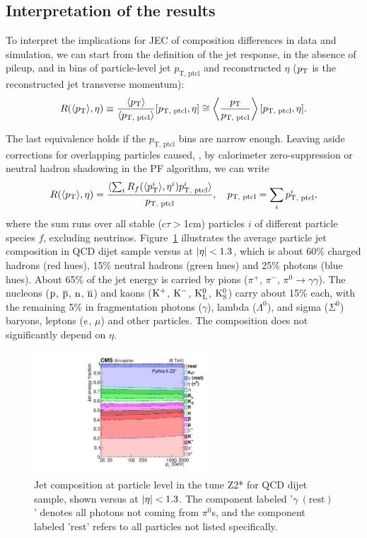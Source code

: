\documentclass[11pt,twoside,a4paper,cmspaper,final,collab]{cms-tdr}
\begin{document}
\subsection*{Interpretation of the results}

To interpret the implications for JEC of composition differences in data and simulation, we can start from the definition of the jet response, in the absence of pileup, and in bins of particle-level jet $p_\text{T, ptcl}$ and reconstructed $\eta$ ($p_{\mathrm{T}}$ is the reconstructed jet transverse momentum):
\begin{equation}
\label{eq:jes}
R(\langle p_{\mathrm{T}}\rangle,\eta)  \equiv \frac{\langle p_{\mathrm{T}}\rangle}{\langle p_\text{T, ptcl}\rangle} [p_\text{T, ptcl},\eta] \cong \left\langle \frac{p_{\mathrm{T}}}{p_\text{T, ptcl}} \right\rangle [p_\text{T, ptcl},\eta].
\end{equation}

The last equivalence holds if the $p_\text{T, ptcl}$ bins are narrow enough.
Leaving aside corrections for overlapping particles caused, \eg, by calorimeter zero-suppression or neutral hadron shadowing in the PF algorithm, we can write
\begin{equation}\label{eq:jec}
R(\langle p_{\mathrm{T}}\rangle,\eta)
= \frac{\langle\sum_{i} R_f (\langle p_{\mathrm{T}}^{i}\rangle,\eta^i)p_\text{T, ptcl}^{i}\rangle}{p_\text{T, ptcl}},
\quad p_\text{T, ptcl} = \sum_i p_\text{T, ptcl}^{i},
\end{equation}
where the sum runs over all stable ($c\tau>$1\unit{cm}) particles $i$ of different particle species $f$, excluding neutrinos.
Figure~\ref{fig:genfrac} illustrates the average particle jet composition in QCD dijet sample versus \pt at $\lvert \eta \rvert<1.3$, which is about 60\% charged hadrons (red hues), 15\% neutral hadrons (green hues) and 25\% photons (blue hues). About 65\% of the jet energy is carried by pions ($\pi^+$, $\pi^-$, $\pi^0\to\gamma\gamma$).
The nucleons ($\mathrm{p}$, $\overline{\mathrm{p}}$, $\mathrm{n}$, $\overline{\mathrm{n}}$) and kaons ($\mathrm{K^+}$, $\mathrm{K^-}$, $\mathrm{K^0_L}$, $\mathrm{K^0_S}$) carry about 15\% each, with the remaining 5\% in fragmentation photons ($\gamma$), lambda ($\Lambda^0$), and sigma ($\Sigma^0$) baryons, leptons ($\mathrm{e}$, $\mu$) and other particles. The composition does not significantly depend on $\eta$.

\begin{figure}[htbp!]
\centering
\includegraphics[width=0.58\textwidth]{Figure_047.pdf}
\caption{\label{fig:genfrac}Jet composition at particle level in the  tune Z2* for QCD dijet sample, shown versus \pt at $\lvert \eta \rvert<1.3$. The component labeled '$\gamma~(\text{rest})$' denotes all photons not coming from $\pi^0$s, and the component labeled 'rest' refers to all particles not listed specifically.}
\end{figure}
\end{document}

